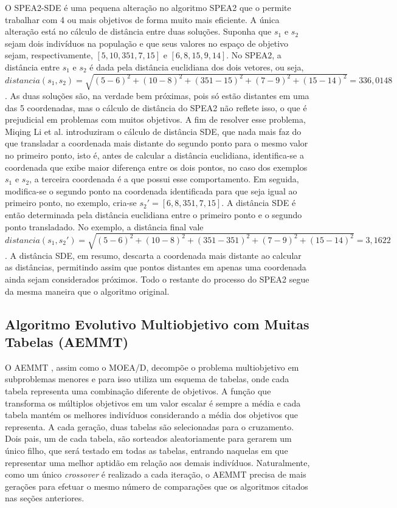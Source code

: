O SPEA2-SDE \cite{Spea2SDE} é uma pequena alteração no algoritmo SPEA2 que o permite trabalhar com 4 ou mais objetivos de forma muito mais eficiente. A única alteração está no cálculo de distância entre duas soluções. Suponha que $s_1$ e $s_2$ sejam dois indivíduos na população e que seus valores no espaço de objetivo sejam, respectivamente, $[5, 10, 351, 7, 15]$ e $[6, 8, 15, 9, 14]$. No SPEA2, a distância entre $s_1$ e $s_2$ é dada pela distância euclidiana dos dois vetores, ou seja, $distancia(s_1, s_2) = \sqrt{(5-6)^2 + (10-8)^2 + (351-15)^2 + (7-9)^2 + (15-14)^2} = 336,0148$. As duas soluções são, na verdade bem próximas, pois só estão distantes em uma das 5 coordenadas, mas o cálculo de distância do SPEA2 não reflete isso, o que é prejudicial em problemas com muitos objetivos. A fim de resolver esse problema, Miqing Li et al. introduziram o cálculo de distância \ac{SDE}, que nada mais faz do que transladar a coordenada mais distante do segundo ponto para o mesmo valor no primeiro ponto, isto é, antes de calcular a distância euclidiana, identifica-se a coordenada que exibe maior diferença entre os dois pontos, no caso dos exemplos $s_1$ e $s_2$, a terceira coordenada é a que possui esse comportamento. Em seguida, modifica-se o segundo ponto na coordenada identificada para que seja igual ao primeiro ponto, no exemplo, cria-se $s_2' = [6, 8, 351, 7, 15]$. A distância SDE é então determinada pela distância euclidiana entre o primeiro ponto e o segundo ponto transladado. No exemplo, a distância final vale $distancia(s_1, s_2') = \sqrt{(5-6)^2 + (10-8)^2 + (351-351)^2 + (7-9)^2 + (15-14)^2} = 3,1622$. A distância SDE, em resumo, descarta a coordenada mais distante ao calcular as distâncias, permitindo assim que pontos distantes em apenas uma coordenada ainda sejam considerados próximos. Todo o restante do processo do SPEA2 segue da mesma maneira que o algoritmo original.

\subsection{Algoritmo Evolutivo Multiobjetivo com Muitas Tabelas (AEMMT)}

O AEMMT \cite{Brasil2013}, assim como o MOEA/D, decompõe o problema multiobjetivo em subproblemas menores e para isso utiliza um esquema de tabelas, onde cada tabela representa uma combinação diferente de objetivos. A função que transforma os múltiplos objetivos em um valor escalar é sempre a média e cada tabela mantém os melhores indivíduos considerando a média dos objetivos que representa. A cada geração, duas tabelas são selecionadas para o cruzamento. Dois pais, um de cada tabela, são sorteados aleatoriamente para gerarem um único filho, que será testado em todas as tabelas, entrando naquelas em que representar uma melhor aptidão em relação aos demais indivíduos. Naturalmente, como um único \textit{crossover} é realizado a cada iteração, o AEMMT precisa de mais gerações para efetuar o mesmo número de comparações que os algoritmos citados nas seções anteriores.

